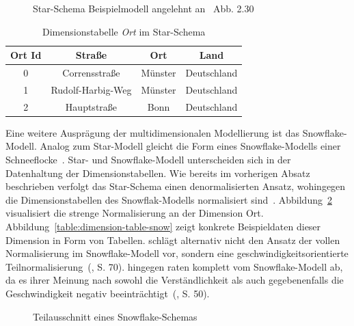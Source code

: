 \documentclass[
  language=german, %
  type=bachelor,%
  ngerman
]{isthesis}
\begin{document}
\begin{content}
  \begin{figure}
    \resizebox{0.5\linewidth}{!}{}
    \caption[Star-Schema Beispielmodell]{Star-Schema Beispielmodell angelehnt an~\cite{Kemper2010} Abb. 2.30}\label{fig:star-schema}
  \end{figure}

  \begin{table}[]
    \footnotesize
    \begin{tabular}{c c c c}
      Ort Id & Straße & Ort & Land \\
      \toprule
      0 & Corrensstraße & Münster & Deutschland \\
      1 & Rudolf-Harbig-Weg & Münster & Deutschland \\
      2 & Hauptstraße & Bonn & Deutschland \\
    \end{tabular}
    \caption{Dimensionstabelle \textit{Ort} im Star-Schema}\label{table:dimension-table}
  \end{table}

  Eine weitere Ausprägung der multidimensionalen Modellierung ist das Snowflake-Modell.
  Analog zum Star-Modell gleicht die Form eines Snowflake-Modells einer
  Schneeflocke~\cite[][S. 70]{Kemper2010}. Star- und Snowflake-Modell
  unterscheiden sich in der Datenhaltung der Dimensionstabellen. Wie bereits im
  vorherigen Absatz beschrieben verfolgt das Star-Schema einen denormalisierten
  Ansatz, wohingegen die Dimensionstabellen des Snowflak-Modells normalisiert
  sind~\cite[][S. 70]{Kemper2010}. Abbildung~\ref{fig:snowflake-schema}
  visualisiert die strenge Normalisierung an der Dimension Ort.
  Abbildung~\ref{table:dimension-table-snow} zeigt konkrete Beispieldaten dieser
  Dimension in Form von Tabellen.  \textsc{\citeauthor{Kemper2010}} schlägt alternativ
  nicht den Ansatz der vollen Normalisierung im Snowflake-Modell vor, sondern eine
  geschwindigkeitsorientierte Teilnormalisierung~(\citeyear{Kemper2010}, S. 70).
  \textsc{\citeauthor{Kimball2013}} hingegen raten komplett vom Snowflake-Modell
  ab, da es ihrer Meinung nach sowohl die Verständlichkeit als auch gegebenenfalls die
  Geschwindigkeit negativ beeinträchtigt~(\citeyear{Kimball2013}, S. 50).

  \begin{figure}
    \resizebox{250pt}{!}{}
    \caption{Teilausschnitt eines Snowflake-Schemas}\label{fig:snowflake-schema}
  \end{figure}


\end{content}
\end{document}
